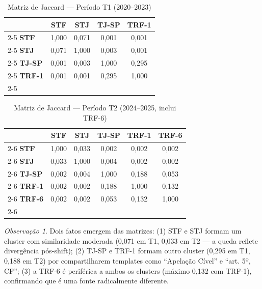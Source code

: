 \documentclass[12pt,a4paper]{article}
\theoremstyle{remark}
\newtheorem{obs}{Observação}[section]
\begin{document}
\begin{table}[H]\centering\footnotesize
\caption{Matriz de Jaccard — Período T1 (2020--2023)}
\label{tab:matriz_t1}
\begin{tabular}{l|c|c|c|c|}
\multicolumn{1}{l}{} & \multicolumn{1}{c}{\textbf{STF}} & \multicolumn{1}{c}{\textbf{STJ}} & \multicolumn{1}{c}{\textbf{TJ-SP}} & \multicolumn{1}{c}{\textbf{TRF-1}} \\
\cline{2-5}
\textbf{STF}   & 1,000 & 0,071 & 0,001 & 0,001 \\
\cline{2-5}
\textbf{STJ}   & 0,071 & 1,000 & 0,003 & 0,001 \\
\cline{2-5}
\textbf{TJ-SP} & 0,001 & 0,003 & 1,000 & 0,295 \\
\cline{2-5}
\textbf{TRF-1} & 0,001 & 0,001 & 0,295 & 1,000 \\
\cline{2-5}
\end{tabular}
\end{table}

\begin{table}[H]\centering\footnotesize
\caption{Matriz de Jaccard — Período T2 (2024--2025, inclui TRF-6)}
\label{tab:matriz_t2}
\begin{tabular}{l|c|c|c|c|c|}
\multicolumn{1}{l}{} & \multicolumn{1}{c}{\textbf{STF}} & \multicolumn{1}{c}{\textbf{STJ}} & \multicolumn{1}{c}{\textbf{TJ-SP}} & \multicolumn{1}{c}{\textbf{TRF-1}} & \multicolumn{1}{c}{\textbf{TRF-6}} \\
\cline{2-6}
\textbf{STF}   & 1,000 & 0,033 & 0,002 & 0,002 & 0,002 \\
\cline{2-6}
\textbf{STJ}   & 0,033 & 1,000 & 0,004 & 0,002 & 0,002 \\
\cline{2-6}
\textbf{TJ-SP} & 0,002 & 0,004 & 1,000 & 0,188 & 0,053 \\
\cline{2-6}
\textbf{TRF-1} & 0,002 & 0,002 & 0,188 & 1,000 & 0,132 \\
\cline{2-6}
\textbf{TRF-6} & 0,002 & 0,002 & 0,053 & 0,132 & 1,000 \\
\cline{2-6}
\end{tabular}
\end{table}

\begin{obs}
Dois fatos emergem das matrizes: (1) STF e STJ formam um cluster com similaridade moderada (0,071 em T1, 0,033 em T2 — a queda reflete divergência pós-shift); (2) TJ-SP e TRF-1 formam outro cluster (0,295 em T1, 0,188 em T2) por compartilharem templates como ``Apelação Cível'' e ``art. 5º, CF''; (3) a TRF-6 é periférica a ambos os clusters (máximo 0,132 com TRF-1), confirmando que é uma fonte radicalmente diferente.
\end{obs}
\end{document}
